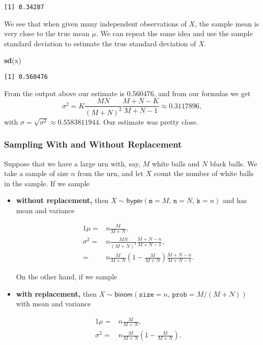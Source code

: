 \documentclass[]{book}
\newenvironment{Shaded}{\begin{snugshade}}{\end{snugshade}}
\newcommand{\KeywordTok}[1]{\textcolor[rgb]{0.13,0.29,0.53}{\textbf{{#1}}}}
\newcommand{\NormalTok}[1]{{#1}}
\providecommand{\tightlist}{%
  \setlength{\itemsep}{0pt}\setlength{\parskip}{0pt}}
\numberwithin{equation}{chapter}
\numberwithin{figure}{chapter}
\theoremstyle{plain}
\theoremstyle{definition}
\theoremstyle{remark}
\theoremstyle{definition}
\theoremstyle{definition}
\theoremstyle{remark}
\begin{document}
\begin{verbatim}
[1] 0.34287
\end{verbatim}

We see that when given many independent observations of \(X\), the
sample mean is very close to the true mean \(\mu\). We can repeat the
same idea and use the sample standard deviation to estimate the true
standard deviation of \(X\).

\begin{Shaded}
\begin{Highlighting}[]
\KeywordTok{sd}\NormalTok{(x)}
\end{Highlighting}
\end{Shaded}

\begin{verbatim}
[1] 0.560476
\end{verbatim}

From the output above our estimate is 0.560476, and from our formulas we
get \[
\sigma^{2}=K\frac{MN}{(M+N)^{2}}\frac{M+N-K}{M+N-1}\approx0.3117896,
\] with \(\sigma=\sqrt{\sigma^{2}}\approx0.5583811944\). Our estimate
was pretty close.

\subsubsection{Sampling With and Without
Replacement}\label{sub-sampling-with-and}

Suppose that we have a large urn with, say, \(M\) white balls and \(N\)
black balls. We take a sample of size \(n\) from the urn, and let \(X\)
count the number of white balls in the sample. If we sample

\begin{itemize}
\tightlist
\item
  \textbf{without replacement,} then
  \(X\sim\mathsf{hyper}(\mathtt{m=}M,\,\mathtt{n}=N,\,\mathtt{k}=n)\)
  and has mean and variance

  \begin{alignat*}{1}
   \mu= & n\frac{M}{M+N},\\
   \sigma^{2}= & n\frac{MN}{(M+N)^{2}}\frac{M+N-n}{M+N-1},\\
   = & n\frac{M}{M+N}\left(1-\frac{M}{M+N}\right)\frac{M+N-n}{M+N-1}.
   \end{alignat*}

  On the other hand, if we sample
\item
  \textbf{with replacement,} then
  \(X\sim\mathsf{binom}(\mathtt{size}=n,\,\mathtt{prob}=M/(M+N))\) with
  mean and variance

  \begin{alignat*}{1}
   \mu= & n\frac{M}{M+N},\\
   \sigma^{2}= & n\frac{M}{M+N}\left(1-\frac{M}{M+N}\right).
   \end{alignat*}
\end{itemize}
\end{document}
